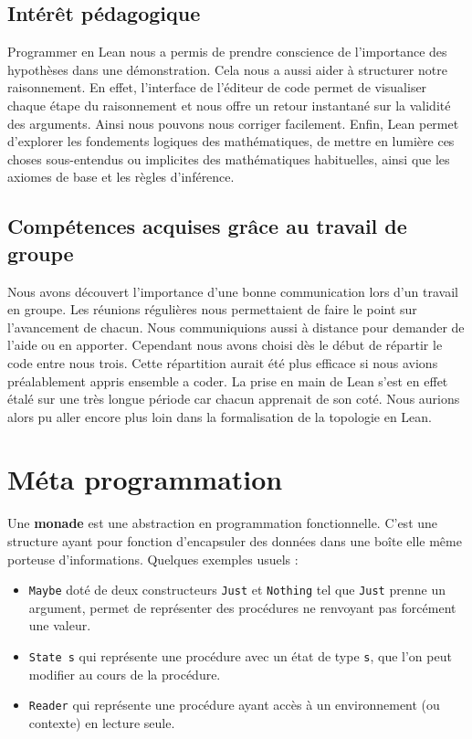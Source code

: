 \documentclass[a4paper, 12pt]{article}
\newcommand{\haskell}[1]{\texttt{#1}}
\begin{document}
\subsection{Intérêt pédagogique}

Programmer en Lean nous a permis de prendre conscience de l’importance des hypothèses dans une démonstration. Cela nous a aussi aider à structurer notre raisonnement. En effet, l’interface de l’éditeur de code permet de visualiser chaque étape du raisonnement et nous offre un retour instantané sur la validité des arguments. Ainsi nous pouvons nous corriger facilement. Enfin, Lean permet d'explorer les fondements logiques des mathématiques, de mettre en lumière ces choses sous-entendus ou implicites des mathématiques habituelles, ainsi que les axiomes de base et les règles d'inférence.


\subsection{Compétences acquises grâce au travail de groupe}

Nous avons découvert l’importance d’une bonne communication lors d’un travail en groupe. Les réunions régulières nous permettaient de faire le point sur l’avancement de chacun. Nous communiquions aussi à distance pour demander de l’aide ou en apporter. Cependant nous avons choisi dès le début de répartir le code entre nous trois. Cette répartition aurait été plus efficace si nous avions préalablement appris ensemble a coder. La prise en main de Lean s’est en effet étalé sur une très longue période car chacun apprenait de son coté. Nous aurions alors pu aller encore plus loin dans la formalisation de la topologie en Lean.

\newpage

\appendix

\section{Méta programmation}

Une \textbf{monade} est une abstraction en programmation fonctionnelle. C'est une structure ayant pour fonction d'encapsuler des données dans une boîte elle même porteuse d'informations. Quelques exemples usuels :

\begin{itemize}
    \item \haskell{Maybe} doté de deux constructeurs \haskell{Just} et \haskell{Nothing} tel que \haskell{Just} prenne un argument, permet de représenter des procédures ne renvoyant pas forcément une valeur.
    \item \haskell{State s} qui représente une procédure avec un état de type \haskell{s}, que l'on peut modifier au cours de la procédure.
    \item \haskell{Reader} qui représente une procédure ayant accès à un environnement (ou contexte) en lecture seule.
\end{itemize}
\end{document}
